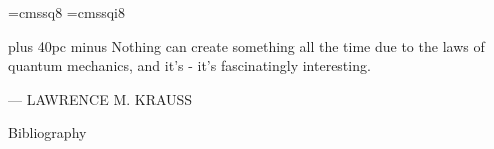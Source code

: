 \documentclass[aspectratio=169, handout]{beamer}
\begin{document}
\font\eightss=cmssq8
\font\eightssi=cmssqi8
\newcommand\quoteAuthorDate[2]{\begingroup
  \baselineskip 10pt
  \parfillskip 0pt
  \interlinepenalty 10000 %
  \leftskip 0pt plus 40pc minus \parindent
  \let\rm=\eightss
  \let\sl=\eightssi
  \everypar{\sl}#1\par
  \nobreak\smallskip
  \noindent\rm--- #2
  \endgroup}
\begin{frame}
    \begin{center}
        \item \quoteAuthorDate{Nothing can create something all the time due to the laws of quantum mechanics, and it's - it's fascinatingly interesting.}{LAWRENCE M. KRAUSS}
    \end{center}
\end{frame}

\begin{frame}{Bibliography}
    
    
\end{frame}
\end{document}
